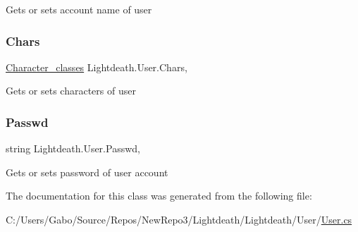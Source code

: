 Gets or sets account name of user 

\hypertarget{class_lightdeath_1_1_user_a79375ec28ff18a65b0d9174df55274ce}{}\label{class_lightdeath_1_1_user_a79375ec28ff18a65b0d9174df55274ce} 
\subsubsection{\texorpdfstring{Chars}{Chars}}
{\footnotesize\ttfamily \hyperlink{class_lightdeath_1_1_character__classes}{Character\+\_\+classes} Lightdeath.\+User.\+Chars\hspace{0.3cm}{\ttfamily [get]}, {\ttfamily [set]}}



Gets or sets characters of user 

\hypertarget{class_lightdeath_1_1_user_ac1613c01ca9ee47faf2fe75cfb836797}{}\label{class_lightdeath_1_1_user_ac1613c01ca9ee47faf2fe75cfb836797} 
\subsubsection{\texorpdfstring{Passwd}{Passwd}}
{\footnotesize\ttfamily string Lightdeath.\+User.\+Passwd\hspace{0.3cm}{\ttfamily [get]}, {\ttfamily [set]}}



Gets or sets password of user account 



The documentation for this class was generated from the following file\+:\begin{DoxyCompactItemize}
\item 
C\+:/\+Users/\+Gabo/\+Source/\+Repos/\+New\+Repo3/\+Lightdeath/\+Lightdeath/\+User/\hyperlink{_user_8cs}{User.\+cs}\end{DoxyCompactItemize}
